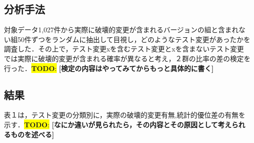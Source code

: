 \documentclass[uplatex,dvipdfmx,a4paper,twocolumn,base=11pt,jbase=11pt,ja=standard]{bxjsarticle}  %
\newcommand{\todo}[1]{\colorbox{yellow}{{\bf TODO}:}{\color{red} {\textbf{[#1]}}}}
\begin{document}

\subsection{分析手法}

対象データ1,027件から実際に破壊的変更が含まれるバージョンの組と含まれない組50件ずつをランダムに抽出して目視し，どのようなテスト変更があったかを調査した．その上で，テスト変更xを含むテスト変更とxを含まないテスト変更では実際に破壊的変更が含まれる確率が異なると考え，２群の比率の差の検定を行った．\todo{検定の内容はやってみてからもっと具体的に書く}

\subsection{結果}

表１は，テスト変更の分類別に，実際の破壊的変更有無,統計的優位差の有無を示す．\todo{なにか違いが見られたら，その内容とその原因として考えられるものを述べる}

\begin{table}[t]
    \vspace{0mm}
    \centering
    \caption{\todo{こういうイメージの表を作る}}
    \label{table_test_change}
\end{table}
\end{document}
